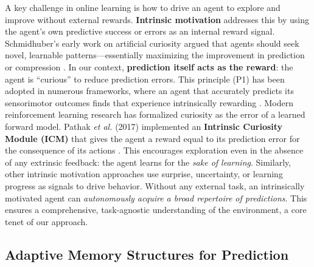 \documentclass[11pt]{article}
\begin{document}
A key challenge in online learning is how to drive an agent to explore and improve without external rewards. \textbf{Intrinsic motivation} addresses this by using the agent’s own predictive success or errors as an internal reward signal. Schmidhuber’s early work on artificial curiosity argued that agents should seek novel, learnable patterns—essentially maximizing the improvement in prediction or compression \cite{Schmidhuber1991}. In our context, \textbf{prediction itself acts as the reward}: the agent is “curious” to reduce prediction errors. This principle (P1) has been adopted in numerous frameworks, where an agent that accurately predicts its sensorimotor outcomes finds that experience intrinsically rewarding \cite{ORegan2001}. Modern reinforcement learning research has formalized curiosity as the error of a learned forward model. Pathak \emph{et al.} (2017) implemented an \textbf{Intrinsic Curiosity Module (ICM)} that gives the agent a reward equal to its prediction error for the consequence of its actions \cite{Pathak2017}. This encourages exploration even in the absence of any extrinsic feedback: the agent learns for the \emph{sake of learning}. Similarly, other intrinsic motivation approaches use surprise, uncertainty, or learning progress as signals to drive behavior. Without any external task, an intrinsically motivated agent can \emph{autonomously acquire a broad repertoire of predictions}. This ensures a comprehensive, task-agnostic understanding of the environment, a core tenet of our approach.

\subsection{Adaptive Memory Structures for Prediction}
\end{document}
